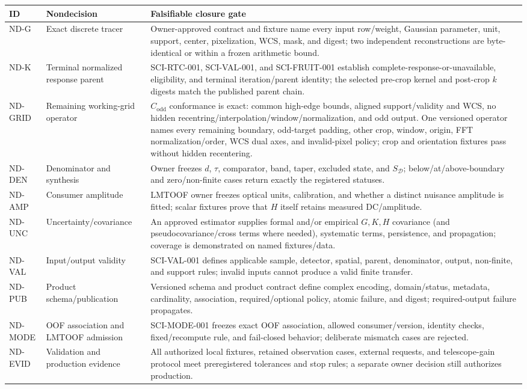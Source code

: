 \documentclass[11pt]{article}
\begin{document}
\begin{longtable}{@{}L{0.13\textwidth}L{0.34\textwidth}L{0.44\textwidth}@{}}
\toprule
ID & Nondecision & Falsifiable closure gate \\
\midrule
\endhead
ND-G & Exact discrete tracer & Owner-approved contract and fixture name every
input row/weight, Gaussian parameter, unit, support, center, pixelization,
WCS, mask, and digest; two independent reconstructions are byte-identical or
within a frozen arithmetic bound. \\
ND-K & Terminal normalized response parent & SCI-RTC-001, SCI-VAL-001, and
SCI-FRUIT-001 establish complete-response-or-unavailable, eligibility, and
terminal iteration/parent identity; the selected pre-crop kernel and post-crop
$k$ digests match the published parent chain. \\
ND-GRID & Remaining working-grid operator & $C_{\mathrm{odd}}$ conformance is
exact: common high-edge bounds, aligned support/validity and WCS, no hidden
recentring/interpolation/window/normalization, and odd output.  One versioned
operator names every remaining boundary, odd-target padding, other crop,
window, origin, FFT normalization/order, WCS dual axes, and invalid-pixel
policy; crop and orientation fixtures pass without hidden recentering. \\
ND-DEN & Denominator and synthesis & Owner freezes $d$, $\tau$, comparator,
band, taper, excluded state, and $S_{\mathcal D}$; below/at/above-boundary and
zero/non-finite cases return exactly the registered statuses. \\
ND-AMP & Consumer amplitude & LMTOOF owner freezes optical units, calibration,
and whether a distinct nuisance amplitude is fitted; scalar fixtures prove
that $H$ itself retains measured DC/amplitude. \\
ND-UNC & Uncertainty/covariance & An approved estimator supplies formal and/or
empirical $G,K,H$ covariance (and pseudocovariance/cross terms where needed),
systematic terms, persistence, and propagation; coverage is demonstrated on
named fixtures/data. \\
ND-VAL & Input/output validity & SCI-VAL-001 defines applicable sample,
detector, spatial, parent, denominator, output, non-finite, and support rules;
invalid inputs cannot produce a valid finite transfer. \\
ND-PUB & Product schema/publication & Versioned schema and product contract
define complex encoding, domain/status, metadata, cardinality, association,
required/optional policy, atomic failure, and digest; required-output failure
propagates. \\
ND-MODE & OOF association and LMTOOF admission & SCI-MODE-001 freezes exact OOF
association, allowed consumer/version, identity checks, fixed/recompute rule,
and fail-closed behavior; deliberate mismatch cases are rejected. \\
ND-EVID & Validation and production evidence & All authorized local fixtures,
retained observation cases, external requests, and telescope-gain protocol
meet preregistered tolerances and stop rules; a separate owner decision still
authorizes production. \\
\bottomrule
\end{longtable}
\end{document}
